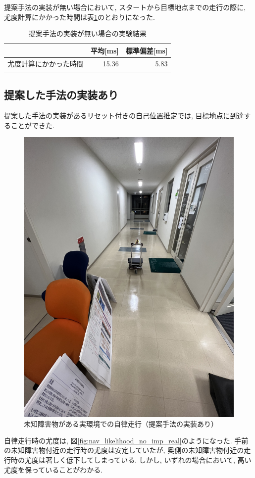 提案手法の実装が無い場合において, スタートから目標地点までの走行の際に, 
尤度計算にかかった時間は表\ref{tabule:likelihood_calc_time_no_imp}のとおりになった. 

\begin{table}[ht]
  \begin{center}
    \caption{提案手法の実装が無い場合の実験結果}
    \label{tabule:likelihood_calc_time_no_imp}
    \begin{tabular}{l|r|r} 
      \thline
      & 平均[ms] &  標準偏差[ms] \\
      \hline
      尤度計算にかかった時間 & 15.36 & 5.83 \\
      \thline
    \end{tabular}
  \end{center}
\end{table}

\subsection{提案した手法の実装あり}

提案した手法の実装があるリセット付きの自己位置推定では, 目標地点に到達することができた. 

\begin{figure}[H]
  \begin{center}
    \includegraphics[width=0.5\linewidth]{figs/nav_real_imp.jpg}
    \caption{未知障害物がある実環境での自律走行（提案手法の実装あり）}
    \label{fig:nav_imp_real}
  \end{center}
\end{figure}

自律走行時の尤度は, 図\ref{fig:nav_likelihood_no_imp_real}のようになった. 
手前の未知障害物付近の走行時の尤度は安定していたが, 
奥側の未知障害物付近の走行時の尤度は著しく低下してしまっている. 
しかし, いずれの場合において, 高い尤度を保っていることがわかる. 

